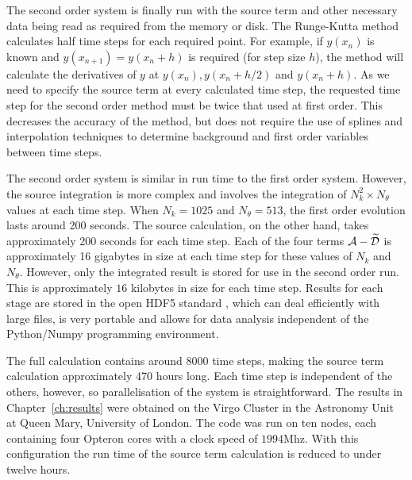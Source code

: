 The second order system is finally run with the source term and other
necessary data being read as required from the memory or disk. The
Runge-Kutta method calculates half time steps for each required point.
For example, if $y(x_n)$ is known and $y(x_{n+1})=y(x_n+h)$ is required
(for step size $h$), the method will calculate the derivatives of $y$
at $y(x_n), y(x_n +h/2)$ and $y(x_n + h)$. As we need to specify the
source term at every calculated time step, the requested time step for
the second order method must be twice that used at first order.  This decreases the
accuracy of the method, but does not require the use
of splines and interpolation techniques to determine background and
first order variables between time steps.


The second order system is similar in run time to the first order 
system. However, the
source integration is more complex and involves the
integration of $N_k^2\times N_\theta$ values at
each time step.
When $N_k=1025$ and $N_\theta=513$, the first order evolution lasts around 200
seconds. The source calculation, on the other hand, takes approximately 200 seconds
for each time step. Each of the four terms $\mathcal{A}-\widetilde{\mathcal{D}}$ is approximately 16 gigabytes
in size at each time step for these values of $N_k$ and $N_\theta$. However, only the
integrated result is stored for use
in the second order run. This is approximately $16$ kilobytes in size for each time
step. 
Results for each stage are stored in the open HDF5 standard
\cite{pytables, hdf5}, which can
deal efficiently with large
files, is very portable and allows for data analysis independent of the
Python/Numpy programming environment.

The full calculation contains around 8000 time steps, making the source term
calculation approximately 470 hours long. Each time step is independent of the
others, however, so parallelisation of the system is straightforward. The results in
Chapter~\ref{ch:results} were obtained on the Virgo Cluster in the Astronomy Unit at
Queen Mary, University of London. The code was run on ten nodes, each containing
four Opteron cores with a clock speed of $1994$Mhz. With this configuration the run
time of the source term calculation is reduced to under twelve hours. 





